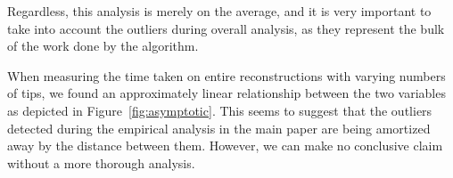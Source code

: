 Regardless, this analysis is merely on the average, and it is very important to take into account the outliers during overall analysis, as they represent the bulk of the work done by the algorithm.



When measuring the time taken on entire reconstructions with varying numbers of tips, we found an approximately linear relationship between the two variables as depicted in Figure~\ref{fig:asymptotic}. 
This seems to suggest that the outliers detected during the empirical analysis in the main paper are being amortized away by the distance between them. 
However, we can make no conclusive claim without a more thorough analysis.



